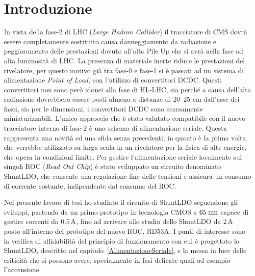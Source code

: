 \chapter{Introduzione}
In vista della fase-2 di LHC (\textit{Large Hadron Collider}) il tracciatore di CMS dovrà essere completamente sostituito causa danneggiamento da radiazione e peggioramento delle prestazioni dovuto all'alto Pile Up che si avrà nella fase ad alta luminosità di LHC.
La presenza di materiale inerte riduce le prestazioni del rivelatore, per questo motivo già tra fase-0 e fase-1 si è passati ad un sistema di alimentazione \textit{Point of Load}, con l'utilizzo di convertitori DCDC. Questi convertitori non sono però idonei alla fase di HL-LHC, sia perché  a causa dell'alta radiazione dovrebbero essere posti almeno a distanze di 20--25 cm dall'asse dei fasci, sia per le dimensioni, i convertitori DCDC sono scarsamente miniaturizzabili. 
L'unico approccio che è stato valutato compatibile con il nuovo tracciatore interno di fase-2 è uno schema di alimentazione seriale. 
Questa rappresenta una novità ed una sfida senza precedenti, in quanto è la prima volta che verrebbe utilizzato su larga scala in un rivelatore per la fisica di alte energie, che opera in condizioni limite. 
Per gestire l'alimentazione seriale localmente sui singoli ROC (\textit{Read Out Chip}) è stato sviluppato un circuito denominato ShuntLDO, che consente una regolazione fine delle tensioni e assicura un consumo di corrente costante, indipendente dal consumo del ROC.

Nel presente lavoro di tesi ho studiato il circuito di ShuntLDO seguendone gli sviluppi, partendo da un primo prototipo in tecnologia CMOS a $65 \rm \; nm$ capace di gestire correnti da $0.5\rm \, A$, fino ad arrivare allo studio dello ShuntLDO da $2\rm \, A$  posto all'interno del prototipo del nuovo ROC, RD53A. 
I punti di interesse sono la verifica di affidabilità del principio di funzionamento con cui è progettato lo ShuntLDO, descritto nel capitolo~\ref{AlimentazioneSeriale}, e la messa in luce delle criticità che si possono avere, specialmente in fasi delicate quali ad esempio l'accensione.

